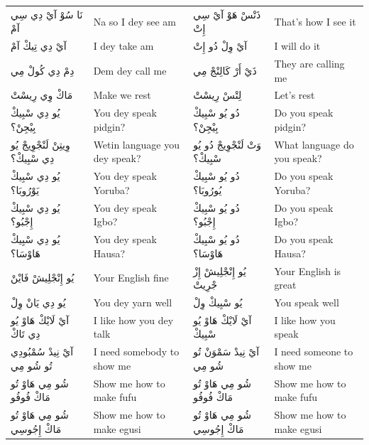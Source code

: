\documentclass[12pt]{article}
\newcommand{\AR}[1]{\foreignlanguage{arabic}{#1}}
\begin{document}
\begin{longtable}{p{3.2cm} p{3.2cm} p{3.2cm} p{3.2cm}}
\AR{نَا} \AR{سُوْ} \AR{آيْ} \AR{دِي} \AR{سِي} \AR{آمْ} & Na so I dey see am & \AR{ذَتْسْ} \AR{هَوْ} \AR{آيْ} \AR{سِي} \AR{إِتْ} & That’s how I see it \\
\AR{آيْ} \AR{دِي} \AR{تِيكْ} \AR{آمْ} & I dey take am & \AR{آيْ} \AR{وِلْ} \AR{دُو} \AR{إِتْ} & I will do it \\
\AR{دِمْ} \AR{دِي} \AR{كُولْ} \AR{مِي} & Dem dey call me & \AR{ذَيْ} \AR{أَرْ} \AR{كَالِنْجْ} \AR{مِي} & They are calling me \\
\AR{مَاكْ} \AR{وِي} \AR{رِيسْتْ} & Make we rest & \AR{لِتْسْ} \AR{رِيسْتْ} & Let’s rest \\
\AR{يُو} \AR{دِي} \AR{سْبِيكْ} \AR{بِيْجِنْ؟} & You dey speak pidgin? & \AR{دُو} \AR{يُو} \AR{سْبِيكْ} \AR{بِيْجِنْ؟} & Do you speak pidgin? \\
\AR{وِيتِنْ} \AR{لَنْجْوِيجْ} \AR{يُو} \AR{دِي} \AR{سْبِيكْ؟} & Wetin language you dey speak? & \AR{وَتْ} \AR{لَنْجْوِيجْ} \AR{دُو} \AR{يُو} \AR{سْبِيكْ؟} & What language do you speak? \\
\AR{يُو} \AR{دِي} \AR{سْبِيكْ} \AR{يَوْرُوبَا؟} & You dey speak Yoruba? & \AR{دُو} \AR{يُو} \AR{سْبِيكْ} \AR{يُورُوبَا؟} & Do you speak Yoruba? \\
\AR{يُو} \AR{دِي} \AR{سْبِيكْ} \AR{إِجْبُو؟} & You dey speak Igbo? & \AR{دُو} \AR{يُو} \AR{سْبِيكْ} \AR{إِجْبُو؟} & Do you speak Igbo? \\
\AR{يُو} \AR{دِي} \AR{سْبِيكْ} \AR{هَاوْسَا؟} & You dey speak Hausa? & \AR{دُو} \AR{يُو} \AR{سْبِيكْ} \AR{هَاوْسَا؟} & Do you speak Hausa? \\
\AR{يُو} \AR{إِنْجْلِيشْ} \AR{فَايْنْ} & Your English fine & \AR{يُو} \AR{إِنْجْلِيشْ} \AR{إِزْ} \AR{جْرِيتْ} & Your English is great \\
\AR{يُو} \AR{دِي} \AR{يَانْ} \AR{وِلْ} & You dey yarn well & \AR{يُو} \AR{سْبِيكْ} \AR{وِلْ} & You speak well \\
\AR{آيْ} \AR{لَايْكْ} \AR{هَاوْ} \AR{يُو} \AR{دِي} \AR{تَاكْ} & I like how you dey talk & \AR{آيْ} \AR{لَايْكْ} \AR{هَاوْ} \AR{يُو} \AR{سْبِيكْ} & I like how you speak \\
\AR{آيْ} \AR{نِيدْ} \AR{سُمْبُودِي} \AR{تُو} \AR{شُو} \AR{مِي} & I need somebody to show me & \AR{آيْ} \AR{نِيدْ} \AR{سَمْوَنْ} \AR{تُو} \AR{شُو} \AR{مِي} & I need someone to show me \\
\AR{شُو} \AR{مِي} \AR{هَاوْ} \AR{تُو} \AR{مَاكْ} \AR{فُوفُو} & Show me how to make fufu & \AR{شُو} \AR{مِي} \AR{هَاوْ} \AR{تُو} \AR{مَاكْ} \AR{فُوفُو} & Show me how to make fufu \\
\AR{شُو} \AR{مِي} \AR{هَاوْ} \AR{تُو} \AR{مَاكْ} \AR{إِجُوسِي} & Show me how to make egusi & \AR{شُو} \AR{مِي} \AR{هَاوْ} \AR{تُو} \AR{مَاكْ} \AR{إِجُوسِي} & Show me how to make egusi \\

\end{longtable}
\end{document}
